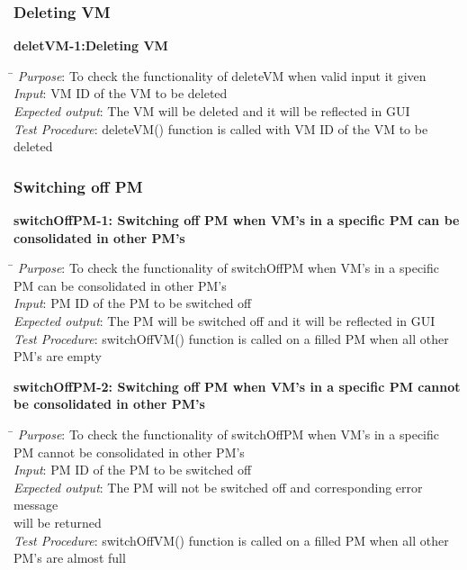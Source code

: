\documentclass[a4paper,10pt]{article}
\begin{document}
\subsubsection{Deleting VM}
\textbf{deletVM-1:Deleting VM }
\begin{tabbing}
  \hspace*{4cm}\= \kill
\emph{Purpose}\>: To check the functionality of deleteVM when valid input it given\\
\emph{Input}\>: VM ID of the VM to be deleted\\
\emph{Expected output}\>: The VM will be deleted and it will be reflected in GUI\\
\emph{Test Procedure}\>: deleteVM() function is called with VM ID of the VM to be deleted\\
\end{tabbing}
\subsubsection{Switching off PM}
\textbf{switchOffPM-1: Switching off PM when VM's in a specific PM can be consolidated in other PM's}
\begin{tabbing}
  \hspace*{4cm}\= \kill
\emph{Purpose}\>: To check the functionality of switchOffPM when VM's in a specific\\ \> PM can be consolidated in other PM's\\
\emph{Input}\>: PM ID of the PM to be switched off\\
\emph{Expected output}\>: The PM will be switched off and it will be reflected in GUI\\
\emph{Test Procedure}\>: switchOffVM() function is called on a filled PM when all other\\ \> PM's are empty\\
\end{tabbing}
\textbf{switchOffPM-2: Switching off PM when VM's in a specific PM cannot be consolidated in other PM's}
\begin{tabbing}
  \hspace*{4cm}\= \kill
\emph{Purpose}\>: To check the functionality of switchOffPM when VM's in a specific\\ \> PM cannot be consolidated in other PM's\\
\emph{Input}\>: PM ID of the PM to be switched off\\
\emph{Expected output}\>: The PM will not be switched off and corresponding error message\\ \> will be returned\\
\emph{Test Procedure}\>: switchOffVM() function is called on a filled PM when all other\\ \> PM's are almost full\\
\end{tabbing}
\end{document}
